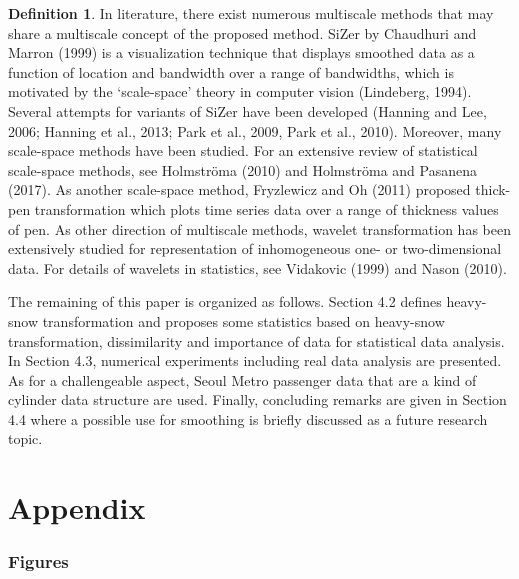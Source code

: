 \documentclass[preprint, review, 12pt]{article}
\theoremstyle{definition}
\newtheorem{dfn}{Definition}
\theoremstyle{remark}
\begin{document}
\begin{dfn}
In literature, there exist numerous multiscale methods that may share a multiscale concept of the proposed method. SiZer by Chaudhuri and Marron (1999) is a visualization technique that displays smoothed data as a function of location and bandwidth over a range of bandwidths, which is motivated by the `scale-space' theory in computer vision (Lindeberg, 1994). Several attempts for variants of SiZer have been developed (Hanning and Lee, 2006; Hanning et al., 2013; Park et al., 2009, Park et al., 2010). Moreover, many scale-space methods have been studied. For an extensive review of statistical scale-space methods, see Holmstr\"oma (2010) and Holmstr\"oma and Pasanena (2017). As another scale-space method, Fryzlewicz and Oh (2011) proposed thick-pen transformation which plots time series data over a range of thickness values of pen. As other direction of multiscale methods, wavelet transformation has been extensively studied for representation of inhomogeneous one- or two-dimensional data. For details of wavelets in statistics, see  Vidakovic (1999) and Nason (2010). 

The remaining of this paper is organized as follows. Section 4.2 defines heavy-snow transformation and proposes some statistics based on heavy-snow transformation, dissimilarity and importance of data for statistical data analysis. In Section 4.3, numerical experiments including real data analysis are presented. As for a challengeable aspect, Seoul Metro passenger data that are a kind of cylinder data structure are used. Finally, concluding remarks are given in Section 4.4 where a possible use for smoothing is briefly discussed as a future research topic. 
\fi 


\section*{Appendix}
\subsubsection*{Figures}


\end{dfn}
\end{document}
